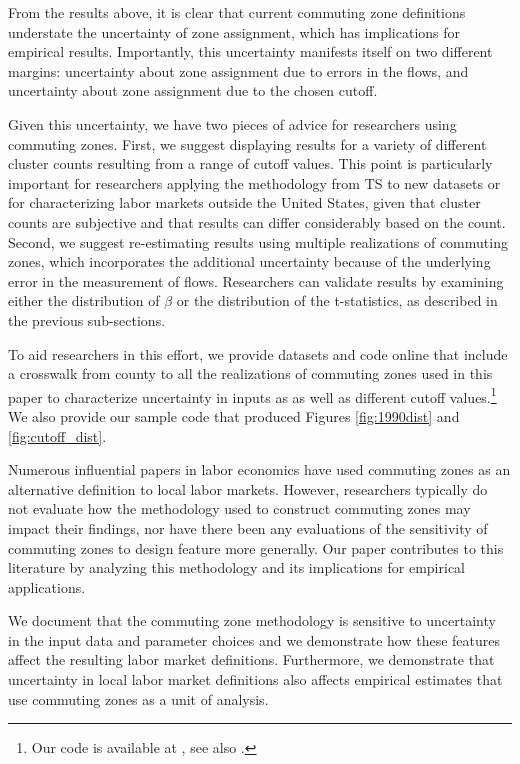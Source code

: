 
From the results above, it is clear that current commuting zone definitions understate the uncertainty of zone assignment, which has implications for empirical results. Importantly, this uncertainty manifests itself on two different margins: uncertainty about zone assignment due to errors in the flows, and uncertainty about zone assignment due to the chosen cutoff. 

Given this uncertainty, we have two pieces of advice for researchers using commuting zones. First, we suggest displaying results for a variety of different cluster counts resulting from a range of cutoff values. This point is particularly important for researchers applying the methodology from TS to new datasets or for characterizing labor markets outside the United States, given that cluster counts are subjective and that results can differ considerably based on the count. Second, we suggest re-estimating results using multiple realizations of commuting zones, which incorporates the additional uncertainty because of the underlying error in the measurement of flows. Researchers can validate results by examining either the distribution of $\beta$ or the distribution of the t-statistics, as described in the previous sub-sections. 

To aid researchers in this effort, we provide datasets and code online that include a crosswalk from county to all the realizations of commuting zones used in this paper to characterize uncertainty in inputs as as well as different cutoff values.\footnote{Our code is available at \iftoggle{blind}{[URL suppressed]}{\url{https://github.com/larsvilhuber/MobZ/}}, see also \iftoggle{blind}{[self-citation suppressed]}{\citet{mobzrepl201704}}.} We also provide our sample code that produced Figures \ref{fig:1990dist} and \ref{fig:cutoff_dist}.

Numerous influential papers in labor economics have used commuting zones as an alternative definition to local labor markets. However, researchers typically do not evaluate how the methodology used to construct commuting zones may impact their findings, nor have there been any evaluations of the sensitivity of commuting zones to design feature more generally. Our paper contributes to this literature by analyzing this methodology and its implications for empirical applications.

We document that the commuting zone methodology is sensitive to uncertainty in the input data and parameter choices and we demonstrate how these features affect the resulting labor market definitions. Furthermore, we demonstrate that uncertainty in local labor market definitions also affects empirical estimates that use commuting zones as a unit of analysis. 


